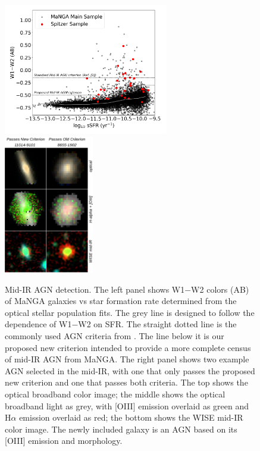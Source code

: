 \documentclass[12pt, preprint]{hacked-aastex}
\begin{document}
\begin{figure}[t!]
\includegraphics[width=0.64\textwidth]{w1w2-vs-ssfr.png}
\includegraphics[width=0.35\textwidth]{ir-grid.drawio.png}
  \vspace{-22pt}
    \caption{
\label{fig:wise} \small Mid-IR AGN detection. 
The left panel shows W1$-$W2 colors (AB) of MaNGA galaxies vs star
formation rate determined from the optical stellar population fits.
The grey line is designed to follow the dependence of W1$-$W2 on SFR.
The straight dotted line is the commonly used AGN criteria from
\cite{assef18a}. The line below it is our proposed new criterion
intended to provide a more complete census of mid-IR AGN from
MaNGA. The right panel shows two example AGN selected in the mid-IR,
with one that only passes the proposed new criterion and one that
passes both criteria. The top shows the optical broadband color image;
the middle shows the optical broadband light as grey, with [OIII]
emission overlaid as green and H$\alpha$ emission overlaid as red; the
bottom shows the WISE mid-IR color image. The newly included galaxy is
an AGN based on its [OIII] emission and morphology.}
\end{figure}
\end{document}
